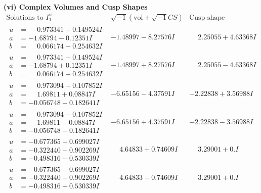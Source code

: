 \documentclass[1p]{elsarticle_modified}
\theoremstyle{definition}
\newcommand{\I}{\sqrt{-1}}
\begin{document}
\newpage\flushleft \textbf{(vi) Complex Volumes and Cusp Shapes}
$$\begin{array}{c|c|c}  
\text{Solutions to }I^u_{1}& \I (\text{vol} + \sqrt{-1}CS) & \text{Cusp shape}\\
 \hline 
\begin{aligned}
u &= \phantom{-}0.973341 + 0.149524 I \\
a &= -1.68794 - 0.12351 I \\
b &= \phantom{-}0.066174 - 0.254632 I\end{aligned}
 & -1.48997 - 8.27576 I & \phantom{-}2.25055 + 4.63368 I \\ \hline\begin{aligned}
u &= \phantom{-}0.973341 - 0.149524 I \\
a &= -1.68794 + 0.12351 I \\
b &= \phantom{-}0.066174 + 0.254632 I\end{aligned}
 & -1.48997 + 8.27576 I & \phantom{-}2.25055 - 4.63368 I \\ \hline\begin{aligned}
u &= \phantom{-}0.973094 + 0.107852 I \\
a &= \phantom{-}1.69811 + 0.08847 I \\
b &= -0.056748 + 0.182641 I\end{aligned}
 & -6.65156 - 4.37591 I & -2.22838 + 3.56988 I \\ \hline\begin{aligned}
u &= \phantom{-}0.973094 - 0.107852 I \\
a &= \phantom{-}1.69811 - 0.08847 I \\
b &= -0.056748 - 0.182641 I\end{aligned}
 & -6.65156 + 4.37591 I & -2.22838 - 3.56988 I \\ \hline\begin{aligned}
u &= -0.677365 + 0.699027 I \\
a &= -0.322440 - 0.902269 I \\
b &= -0.498316 - 0.530339 I\end{aligned}
 & \phantom{-}4.64833 + 0.74609 I & \phantom{-}3.29001 + 0. I\phantom{ +0.000000I} \\ \hline\begin{aligned}
u &= -0.677365 - 0.699027 I \\
a &= -0.322440 + 0.902269 I \\
b &= -0.498316 + 0.530339 I\end{aligned}
 & \phantom{-}4.64833 - 0.74609 I & \phantom{-}3.29001 + 0. I\phantom{ +0.000000I} \\ \hline\begin{aligned}

\end{aligned}
\end{array}$$
\end{document}
